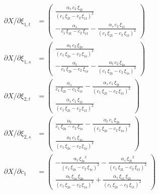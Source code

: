 \documentclass[12pt,a4paper]{extarticle}
\begin{document}
\begin{align*}
\partial X / \partial \xi_{1,t} &= \left(\begin{array}{c} \frac{\alpha _{s}\,c_{2}\,\xi _{\mathrm{2t}}}{{\left(c_{1}\,\xi _{\mathrm{2t}}-c_{2}\,\xi _{\mathrm{1t}}\right)}^2}\\ -\frac{\alpha _{s}}{c_{1}\,\xi _{\mathrm{2t}}-c_{2}\,\xi _{\mathrm{1t}}}-\frac{\alpha _{s}\,c_{2}\,\xi _{\mathrm{1t}}}{{\left(c_{1}\,\xi _{\mathrm{2t}}-c_{2}\,\xi _{\mathrm{1t}}\right)}^2} \end{array}\right) \\
\partial X / \partial \xi_{1,s} &= \left(\begin{array}{c} \frac{\alpha _{t}\,c_{2}\,\xi _{\mathrm{2s}}}{{\left(c_{1}\,\xi _{\mathrm{2s}}-c_{2}\,\xi _{\mathrm{1s}}\right)}^2}\\ -\frac{\alpha _{t}}{c_{1}\,\xi _{\mathrm{2s}}-c_{2}\,\xi _{\mathrm{1s}}}-\frac{\alpha _{t}\,c_{2}\,\xi _{\mathrm{1s}}}{{\left(c_{1}\,\xi _{\mathrm{2s}}-c_{2}\,\xi _{\mathrm{1s}}\right)}^2} \end{array}\right)\\
\partial X / \partial \xi_{2,t} &= \left(\begin{array}{c} \frac{\alpha _{s}}{c_{1}\,\xi _{\mathrm{2t}}-c_{2}\,\xi _{\mathrm{1t}}}-\frac{\alpha _{s}\,c_{1}\,\xi _{\mathrm{2t}}}{{\left(c_{1}\,\xi _{\mathrm{2t}}-c_{2}\,\xi _{\mathrm{1t}}\right)}^2}\\ \frac{\alpha _{s}\,c_{1}\,\xi _{\mathrm{1t}}}{{\left(c_{1}\,\xi _{\mathrm{2t}}-c_{2}\,\xi _{\mathrm{1t}}\right)}^2} \end{array}\right)\\
\partial X / \partial \xi_{2,s} &= \left(\begin{array}{c} \frac{\alpha _{t}}{c_{1}\,\xi _{\mathrm{2s}}-c_{2}\,\xi _{\mathrm{1s}}}-\frac{\alpha _{t}\,c_{1}\,\xi _{\mathrm{2s}}}{{\left(c_{1}\,\xi _{\mathrm{2s}}-c_{2}\,\xi _{\mathrm{1s}}\right)}^2}\\ \frac{\alpha _{t}\,c_{1}\,\xi _{\mathrm{1s}}}{{\left(c_{1}\,\xi _{\mathrm{2s}}-c_{2}\,\xi _{\mathrm{1s}}\right)}^2} \end{array}\right)\\
\partial X / \partial c_{1} &= \left(\begin{array}{c} -\frac{\alpha _{t}\,{\xi _{\mathrm{2s}}}^2}{{\left(c_{1}\,\xi _{\mathrm{2s}}-c_{2}\,\xi _{\mathrm{1s}}\right)}^2}-\frac{\alpha _{s}\,{\xi _{\mathrm{2t}}}^2}{{\left(c_{1}\,\xi _{\mathrm{2t}}-c_{2}\,\xi _{\mathrm{1t}}\right)}^2}\\ \frac{\alpha _{t}\,\xi _{\mathrm{1s}}\,\xi _{\mathrm{2s}}}{{\left(c_{1}\,\xi _{\mathrm{2s}}-c_{2}\,\xi _{\mathrm{1s}}\right)}^2}+\frac{\alpha _{s}\,\xi _{\mathrm{1t}}\,\xi _{\mathrm{2t}}}{{\left(c_{1}\,\xi _{\mathrm{2t}}-c_{2}\,\xi _{\mathrm{1t}}\right)}^2} \end{array}\right) \\

\end{align*}
\end{document}
